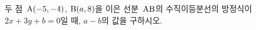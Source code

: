 두 점~$\mathrm{A}(-5{,}\mkern3mu\mathopen{}-4)$, $\mathrm{B}(a{,}\mkern3mu\mathopen{}8)$을 이은 선분~$\mathrm{AB}$의 수직이등분선의 방정식이 $2x+3y+b=0$일 때, $a-b$의 값을 구하시오. 
